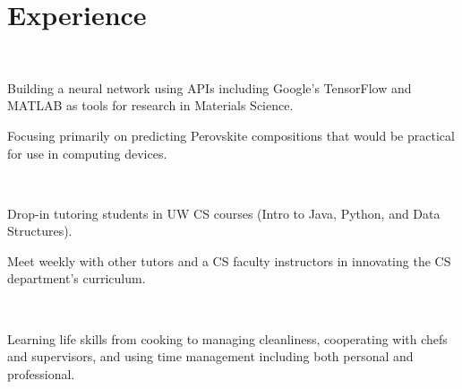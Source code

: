 \documentclass[]{hieudo-build}
\begin{document}
\begin{minipage}[t]{0.65\textwidth} 

\section{Experience}

\\
\vspace{0.9em} %
\begin{tightemize}
\item Building a neural network using APIs including Google's TensorFlow and MATLAB as tools for research in Materials Science.
\item Focusing primarily on predicting Perovskite compositions that would be practical for use in computing devices.
\end{tightemize}
\sectionsep

 \\
\begin{tightemize}
\item Drop-in tutoring students in UW CS courses (Intro to Java, Python, and Data Structures).
\item Meet weekly with other tutors and a CS faculty instructors in innovating the CS department's curriculum.
\end{tightemize}
\sectionsep

 \\
\begin{tightemize}
\item Learning life skills from cooking to managing cleanliness, cooperating with chefs and supervisors, and using time management including both personal and professional.
\end{tightemize}
\sectionsep



\end{minipage}
\end{document}
